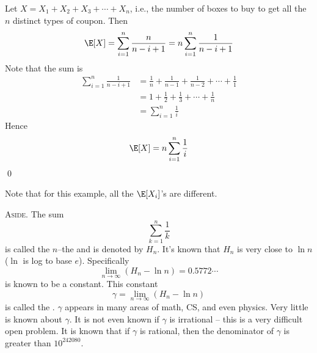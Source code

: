 Let $X = X_1 + X_2 + X_3 + \cdots + X_n$, i.e., the number of boxes to buy
to get all the $n$ distinct types of coupon.
Then
\[
  \E[X] = \sum_{i=1}^n \frac{n}{n - i + 1} = n \sum_{i=1}^n \frac{1}{n - i + 1} 
\]
Note that the sum is
\begin{align*}
  \sum_{i=1}^n \frac{1}{n - i + 1}
  &= \frac{1}{n} + \frac{1}{n - 1} + \frac{1}{n - 2} + \cdots + \frac{1}{1}
  \\
  &= 1 + \frac{1}{2} + \frac{1}{3} + \cdots + \frac{1}{n}
  \\
  &= \sum_{i = 1}^{n} \frac{1}{i}
\end{align*}
Hence
\[
  \E[X] = n \sum_{i = 1}^{n} \frac{1}{i}
\]
\qed

Note that for this example, all the $\E[X_i]$'s are different.

\textsc{Aside.}
The sum 
\[
  \sum_{k = 1}^{n} \frac{1}{k}
\]
is called the $n$--the  and is denoted by $H_n$.
It's known that $H_n$ is very close to $\ln n$ ($\ln$ is log to base $e$).
Specifically
\[
  \lim_{n \rightarrow \infty} (H_n - \ln n) = 0.5772\cdots
\]
is known to be a constant.
This constant
\[
  \gamma = \lim_{n \rightarrow \infty} (H_n - \ln n) 
\]
is called the .
$\gamma$ appears in many areas of math, CS, and even physics.
Very little is known about $\gamma$.
It is not even known if $\gamma$ is irrational --
this is a very difficult open problem.
It is known that if $\gamma$ is rational, then the
denominator of $\gamma$ is greater than $10^{242080}$.





  







\begin{comment}
  $X_{ij}(s)$ is 1 if $s_i = j$ and $s_j = i$.
  Therefore $X = \sum_{i < j} X_{ij} = \sum_{i = 0}{n - 2} \sum_{j = i + 1}^{n - 1} X_{ij}$
  count number of inversions.
\end{comment}

